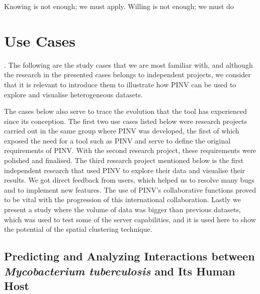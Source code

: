 \begin{savequote}[75mm] 
Knowing is not enough; we must apply. Willing is not enough; we must do
\end{savequote}

\chapter{Use Cases} \label{section:use_cases}

. The following are the study cases that we are most familiar with, and although the research in the presented cases belongs to independent projects, we consider that it is relevant to introduce them to illustrate how PINV can be used to explore and visualise heterogeneous datasets. 

The cases below also serve to trace the evolution that the tool has experienced since its conception. The first two use cases listed below were research projects carried out in the same group where PINV was developed, the first of which exposed the need for a tool such as PINV and serve to define the original requirements of PINV. With the second research project, these requirements were polished and finalised.  The third research project mentioned below is the first independent research that used PINV to explore their data and visualise their results. We got direct feedback from users, which helped us to resolve many bugs and to implement new features. The use of PINV's collaborative functions proved to be vital with the progression of this international collaboration. Lastly we present a study where the volume of data was bigger than previous datasets, which was used to test some of the server capabilities, and it is used here to show the potential of the spatial clustering technique.

\section{Predicting and Analyzing Interactions between \emph{Mycobacterium tuberculosis} and Its Human Host} \label{sec:mb_human}

